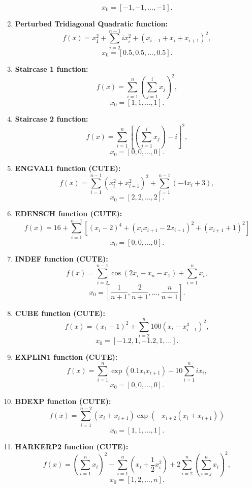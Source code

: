 \documentclass[10pt]{article}
\begin{document}
\begin{enumerate}
    \[
    x_0 = [-1, -1, \ldots, -1].
    \]

    \item \textbf{Perturbed Tridiagonal Quadratic function:}
    \[
    f(x) = x_1^2 + \sum_{i=2}^{n-1} i x_i^2 + (x_{i-1} +  x_i + x_{i+1})^2,
    \]
    \[
    x_0 = [0.5, 0.5, \dots, 0.5].
    \]

    \item \textbf{Staircase 1 function:}
    \[
    f(x) = \sum_{i=1}^{n} \left( \sum_{j=1}^{i} x_j \right)^2,
    \]
    \[
    x_0 = [1, 1, \dots, 1].
    \]

    \item \textbf{Staircase 2 function:}
    \[
    f(x) = \sum_{i=1}^{n}\left[\left( \sum_{j=1}^{i}  x_j\right) - i \right]^2,
    \]
    \[
    x_0 = [0, 0, \dots, 0].
    \]

    \item \textbf{ENGVAL1 function (CUTE):}
    \[
    f(x) = \sum_{i=1}^{n-1} \left( x_i^2 + x_{i+1}^2\right)^2 + \sum_{i=1}^{n-1} \left( -4 x_i + 3 \right),
    \]
    \[
    x_0 = [2, 2, \dots, 2].
    \]


    \item \textbf{EDENSCH function (CUTE):}
    \[
    f(x) = 16 + \sum_{i=1}^{n-1} \left[ (x_i - 2)^4 + (x_i x_{i+1} - 2x_{i+1})^2 + (x_{i+1} + 1)^2\right]
    \]
    \[
    x_0 = [0, 0, \dots, 0].
    \]

    \item \textbf{INDEF function (CUTE):}
    \[
    f(x) = \sum_{i=2}^{n-1} \cos(2x_i - x_n - x_1) + \sum_{i=1}^{n} x_i,
    \]
    \[
    x_0 = \left[ \frac{1}{n+1}, \frac{2}{n+1}, \dots, \frac{n}{n+1} \right].
    \]

    \item \textbf{CUBE function (CUTE):}
    \[
    f(x) = (x_1 - 1)^2 + \sum_{i=2}^{n} 100 \left( x_i - x_{i-1}^3 \right)^2,
    \]
    \[
    x_0 = [-1.2, 1, -1.2, 1, \dots].
    \]

    \item \textbf{EXPLIN1 function (CUTE):}
    \[
    f(x) = \sum_{i=1}^{n} \exp(0.1 x_ix_{i+1}) - 10\sum_{i=1}^n ix_i,
    \]
    \[
    x_0 = [0, 0, \dots, 0].
    \]

    \item \textbf{BDEXP function (CUTE):}
    \[
    f(x) = \sum_{i=1}^{n-2} (x_i + x_{i+1}) \exp(-x_{i+2}(x_i + x_{i+1}))
    \]
    \[
    x_0 = [1, 1, \dots, 1].
    \]

    \item \textbf{HARKERP2 function (CUTE):}
    \[
    f(x) = \left(\sum_{i=1}^{n} x_i \right)^2 - \sum_{i=1}^{n} ( x_i + \frac{1}{2} x_i^2 ) + 2 \sum_{i=2}^{n} \left(\sum_{i=j}^n x_i \right)^2,
    \]
    \[
    x_0 = \left[ 1, 2, ..., n \right].
    \]


\end{enumerate}
\end{document}
